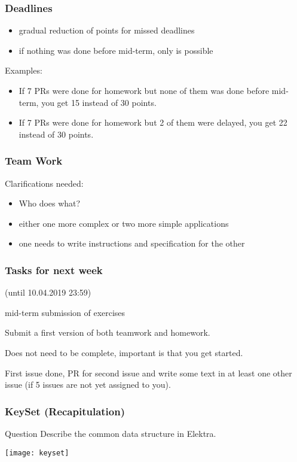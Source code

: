 \begin{frame}
	\frametitle{Deadlines}

	\begin{itemize}
	\item gradual reduction of points for missed deadlines
	\item if nothing was done before mid-term, only  is possible
	\end{itemize}
	Examples:

	\begin{itemize}
	\item If 7 PRs were done for homework but none of them was done before mid-term, you get 15 instead of 30 points.
	\item If 7 PRs were done for homework but 2 of them were delayed, you get 22 instead of 30 points.
	\end{itemize}
\end{frame}

\begin{frame}
	\frametitle{Team Work}


	Clarifications needed:
	\begin{itemize}
	\item Who does what?
	\item either one more complex or two more simple applications
	\item one needs to write instructions and specification for the other
	\end{itemize}
\end{frame}

\begin{assignment}
	\frametitle{Tasks for next week}
	(until 10.04.2019 23:59)

	mid-term submission of exercises
	
	\begin{task}
	Submit a first version of both teamwork and homework.
	\end{task}

	Does not need to be complete, important is that you get started.

	\begin{task}
	First issue done, PR for second issue and write some text in at least one other issue (if 5 issues are not yet assigned to you).
	\end{task}
\end{assignment}




\begin{frame}
	\frametitle{KeySet (Recapitulation)}

	\begin{alertblock}{Question}
	Describe the common data structure in Elektra.
	\end{alertblock}

	\vspace{1cm}
	\pause

	\texttt{[image: keyset]}
\end{frame}

